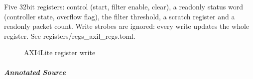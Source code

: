 \documentclass[letterpaper,10pt,english]{sphinxmanual}
\begin{document}
\sphinxAtStartPar
Five 32\sphinxhyphen{}bit registers: control (start, filter enable, clear), a read\sphinxhyphen{}only
status word (controller state, overflow flag), the filter threshold, a
scratch register and a read\sphinxhyphen{}only packet count. Write strobes are ignored:
every write updates the whole register. See registers/regs\_axil\_regs.toml.

\begin{figure}[htbp]
\centering
\capstart

\caption{AXI4\sphinxhyphen{}Lite register write}\label{\detokenize{modules/axil_regs/entity:id1}}\end{figure}


\subparagraph{Annotated Source}
\label{\detokenize{modules/axil_regs/entity:annotated-source}}
\def\sphinxLiteralBlockLabel{\label{\detokenize{modules/axil_regs/entity:id2}}}
\end{document}
